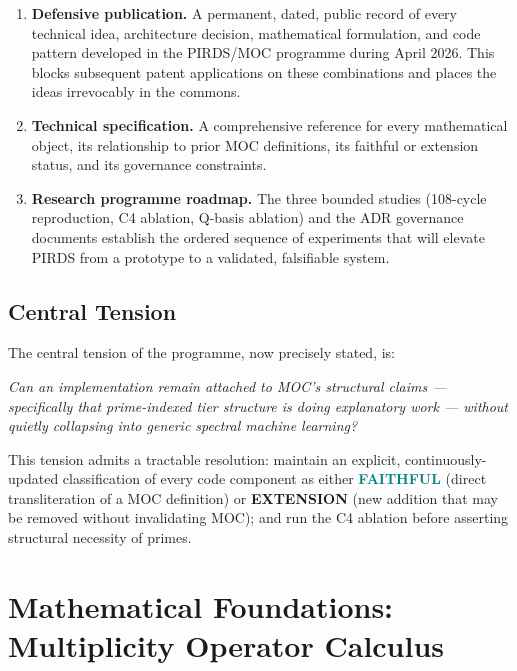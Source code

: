 \documentclass[11pt,a4paper]{article}
\theoremstyle{plain}
\theoremstyle{definition}
\theoremstyle{remark}
\newcommand{\faithful}{\textcolor{teal}{\textbf{FAITHFUL}}}
\newcommand{\extension}{\textcolor{rust}{\textbf{EXTENSION}}}
\begin{document}
\begin{enumerate}[leftmargin=1.5em,itemsep=3pt]
  \item \textbf{Defensive publication.} A permanent, dated, public record of every technical
    idea, architecture decision, mathematical formulation, and code pattern developed in the
    PIRDS/MOC programme during April 2026. This blocks subsequent patent applications on these
    combinations and places the ideas irrevocably in the commons.
  \item \textbf{Technical specification.} A comprehensive reference for every mathematical
    object, its relationship to prior MOC definitions, its faithful or extension status, and
    its governance constraints.
  \item \textbf{Research programme roadmap.} The three bounded studies (108-cycle
    reproduction, C4 ablation, Q-basis ablation) and the ADR governance documents establish
    the ordered sequence of experiments that will elevate PIRDS from a prototype to a
    validated, falsifiable system.
\end{enumerate}

\subsection{Central Tension}

The central tension of the programme, now precisely stated, is:

\begin{tcolorbox}[notebox]
  \textit{Can an implementation remain attached to MOC's structural claims --- specifically
  that prime-indexed tier structure is doing explanatory work --- without quietly collapsing
  into generic spectral machine learning?}
\end{tcolorbox}

This tension admits a tractable resolution: maintain an explicit, continuously-updated
classification of every code component as either \faithful{} (direct transliteration of a
MOC definition) or \extension{} (new addition that may be removed without invalidating MOC);
and run the C4 ablation before asserting structural necessity of primes.

\section{Mathematical Foundations: Multiplicity Operator Calculus}
\end{document}
